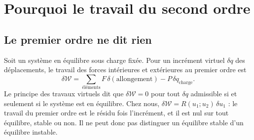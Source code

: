 \documentclass[11pt,a4paper]{article}
\begin{document}
\section{Pourquoi le travail du second ordre}

\subsection{Le premier ordre ne dit rien}
Soit un système en équilibre sous charge fixée. Pour un incrément virtuel $\delta q$ des
déplacements, le travail des forces intérieures et extérieures au premier ordre est
\begin{equation}
  \delta\mathcal W = \sum_{\text{éléments}} F\,\delta(\text{allongement}) - P\,\delta q_{\text{charge}} .
\end{equation}
Le principe des travaux virtuels dit que $\delta\mathcal W = 0$ pour tout $\delta q$ admissible si
et seulement si le système est en équilibre. Chez nous, $\delta\mathcal W = R(u_1;u_2)\,\delta u_1$ :
le travail du premier ordre est le résidu fois l'incrément, et il est nul sur tout équilibre,
stable ou non. Il ne peut donc pas distinguer un équilibre stable d'un équilibre instable.
\end{document}
